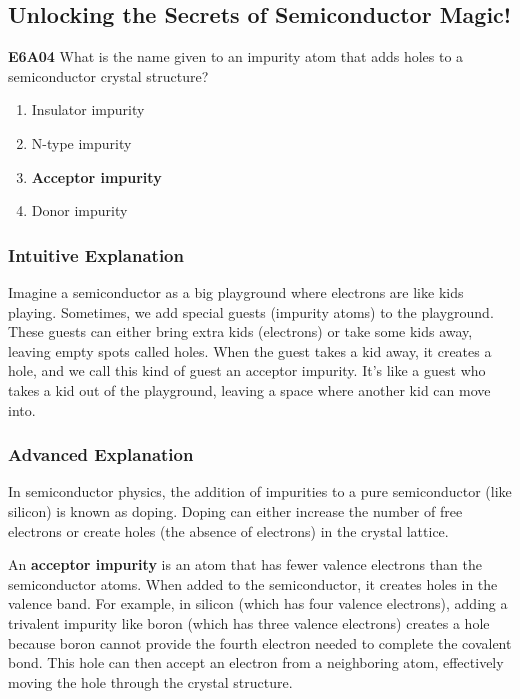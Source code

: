\subsection{Unlocking the Secrets of Semiconductor Magic!}

\begin{tcolorbox}[colback=gray!10!white,colframe=black!75!black,title=E6A04]
\textbf{E6A04} What is the name given to an impurity atom that adds holes to a semiconductor crystal structure?
\begin{enumerate}[label=\Alph*.]
    \item Insulator impurity
    \item N-type impurity
    \item \textbf{Acceptor impurity}
    \item Donor impurity
\end{enumerate}
\end{tcolorbox}

\subsubsection*{Intuitive Explanation}
Imagine a semiconductor as a big playground where electrons are like kids playing. Sometimes, we add special guests (impurity atoms) to the playground. These guests can either bring extra kids (electrons) or take some kids away, leaving empty spots called holes. When the guest takes a kid away, it creates a hole, and we call this kind of guest an acceptor impurity. It’s like a guest who takes a kid out of the playground, leaving a space where another kid can move into.

\subsubsection*{Advanced Explanation}
In semiconductor physics, the addition of impurities to a pure semiconductor (like silicon) is known as doping. Doping can either increase the number of free electrons or create holes (the absence of electrons) in the crystal lattice. 

An \textbf{acceptor impurity} is an atom that has fewer valence electrons than the semiconductor atoms. When added to the semiconductor, it creates holes in the valence band. For example, in silicon (which has four valence electrons), adding a trivalent impurity like boron (which has three valence electrons) creates a hole because boron cannot provide the fourth electron needed to complete the covalent bond. This hole can then accept an electron from a neighboring atom, effectively moving the hole through the crystal structure.

